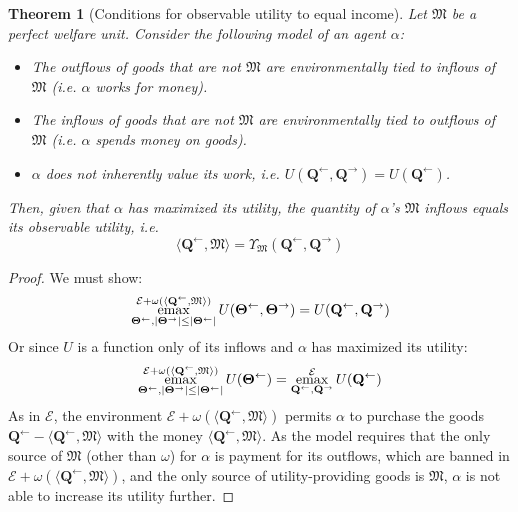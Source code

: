 \documentclass{journal}
\theoremstyle{plain}
\newtheorem{thm}{Theorem}
\theoremstyle{definition}
\theoremstyle{remark}
\newcommand{\economy}{\ensuremath{\mathcal{E}}}
\newcommand{\emax}{\ensuremath{\operatornamewithlimits{emax}}}
\newcommand{\quantl}{\ensuremath{\mathbf{Q}}} %
\newcommand{\quantg}{\ensuremath{\mathbf{\Theta}}} %
\newcommand{\agenta}{\ensuremath{\alpha}}
\newcommand{\agentz}{\ensuremath{\omega}}
\newcommand{\money}{\ensuremath{\mathfrak{M}}}
\newcommand{\utility}{\ensuremath{U}}
\newcommand{\outility}{\ensuremath{\Upsilon}}
\begin{document}
\begin{thm}[Conditions for observable utility to equal income]
    \label{thm:gdp}
    Let $\money$ be a perfect welfare unit. Consider the following model of an agent $\agenta$:
    \begin{itemize}
        \item The outflows of goods that are \emph{not} $\money$ are environmentally tied to inflows of $\money$ (i.e. $\agenta$ works for money).
        \item The inflows of goods that are not $\money$ are environmentally tied to outflows of $\money$ (i.e. $\agenta$ spends money on goods).
        \item $\agenta$ does not inherently value its work, i.e. $\utility(\quantl^\leftarrow, \quantl^\rightarrow)=\utility(\quantl^\leftarrow)$. 
    \end{itemize}
    Then, given that $\agenta$ has maximized its utility, the quantity of $\agenta$'s $\money$ inflows equals its observable utility, i.e.
    \begin{equation}
        \label{eq:gdp}
        \langle \quantl^\leftarrow, \money \rangle = \outility_\money(\quantl^\leftarrow, \quantl^\rightarrow)
    \end{equation}
\end{thm}
\begin{proof}
    We must show:
    \begin{equation*}
        \emax\limits_{\quantg^\leftarrow,|\quantg^\rightarrow|\le|\quantg^\leftarrow|}^{\economy + \agentz\left(\langle \quantl^\leftarrow, \money\rangle\right)} \utility(\quantg^\leftarrow, \quantg^\rightarrow) = \utility(\quantl^\leftarrow, \quantl^\rightarrow)
    \end{equation*}
    Or since $\utility$ is a function only of its inflows and $\agenta$ has maximized its utility:
    \begin{equation*}
        \emax\limits_{\quantg^\leftarrow,|\quantg^\rightarrow|\le|\quantg^\leftarrow|}^{\economy + \agentz\left(\langle \quantl^\leftarrow, \money\rangle\right)} \utility(\quantg^\leftarrow) = \emax_{\quantl^\leftarrow,\quantl^\rightarrow}^\economy \utility(\quantl^\leftarrow)
    \end{equation*}
    As in $\economy$, the environment $\economy+\agentz(\langle \quantl^\leftarrow, \money\rangle)$ permits $\agenta$ to purchase the goods $\quantl^\leftarrow - \langle \quantl^\leftarrow, \money\rangle$ with the money $\langle \quantl^\leftarrow, \money\rangle$. As the model requires that the only source of $\money$ (other than $\agentz$) for $\agenta$ is payment for its outflows, which are banned in $\economy+\agentz(\langle \quantl^\leftarrow, \money\rangle)$, and the only source of utility-providing goods is $\money$, $\agenta$ is not able to increase its utility further.
\end{proof}
\end{document}
